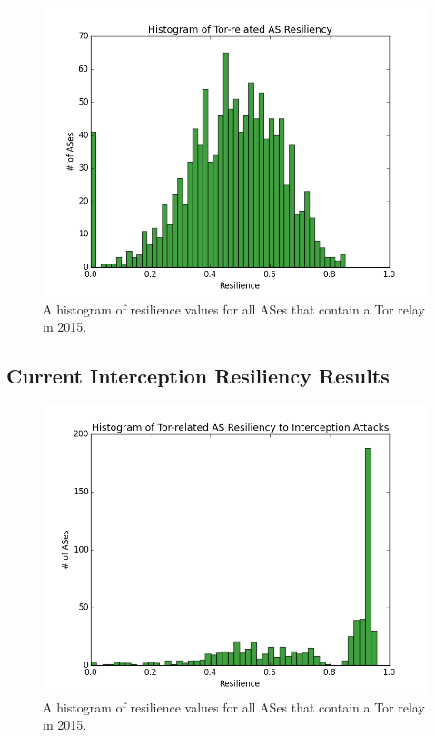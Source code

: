 {\begin{figure}
\centering
\includegraphics[width=.4\textwidth]{resiliency_hist_2015}
\caption{A histogram of resilience values for all ASes that contain a Tor relay in 2015.}
\label{fig:resilience_histogram2015}
\end{figure}
}

\subsection{Current Interception Resiliency Results}

\begin{figure}
\centering
\includegraphics[width=.4\textwidth]{interception_resiliency}
\caption{A histogram of resilience values for all ASes that contain a Tor relay in 2015.}
\label{fig:resilience_histogram2015}
\end{figure}
